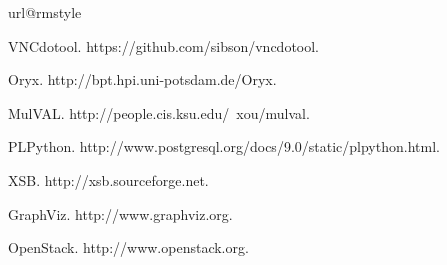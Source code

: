 
%
%
%

\begin{thebibliography}{10}
\providecommand{\url}[1]{#1}
\csname url@rmstyle\endcsname
\providecommand{\newblock}{\relax}
\providecommand{\bibinfo}[2]{#2}
\providecommand\BIBentrySTDinterwordspacing{\spaceskip=0pt\relax}
\providecommand\BIBentryALTinterwordstretchfactor{4}
\providecommand\BIBentryALTinterwordspacing{\spaceskip=\fontdimen2\font plus
\BIBentryALTinterwordstretchfactor\fontdimen3\font minus
  \fontdimen4\font\relax}
\providecommand\BIBforeignlanguage[2]{{%
\expandafter\ifx\csname l@#1\endcsname\relax
\typeout{** WARNING: IEEEtran.bst: No hyphenation pattern has been}%
\typeout{** loaded for the language `#1'. Using the pattern for}%
\typeout{** the default language instead.}%
\else
\language=\csname l@#1\endcsname
\fi
#2}}





VNCdotool. https://github.com/sibson/vncdotool.

Oryx. http://bpt.hpi.uni-potsdam.de/Oryx.

MulVAL. http://people.cis.ksu.edu/~xou/mulval.

PLPython. http://www.postgresql.org/docs/9.0/static/plpython.html.



XSB. http://xsb.sourceforge.net.


GraphViz. http://www.graphviz.org.

OpenStack. http://www.openstack.org.







\end{thebibliography}
